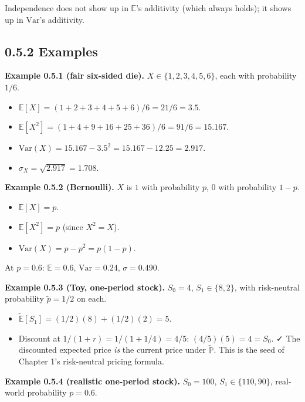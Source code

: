 \documentclass[
  10pt,
  twoside]{book}
\providecommand{\tightlist}{%
  \setlength{\itemsep}{0pt}\setlength{\parskip}{0pt}}
\begin{document}
Independence does not show up in \(\mathbb{E}\)'s additivity (which
always holds); it shows up in \(\mathrm{Var}\)'s additivity.

\subsection{0.5.2 Examples}\label{examples-4}

\textbf{Example 0.5.1 (fair six-sided die).}
\(X \in \{1, 2, 3, 4, 5, 6\}\), each with probability \(1/6\).

\begin{itemize}
\tightlist
\item
  \(\mathbb{E}[X] = (1+2+3+4+5+6)/6 = 21/6 = 3.5\).
\item
  \(\mathbb{E}[X^2] = (1+4+9+16+25+36)/6 = 91/6 = 15.167\).
\item
  \(\mathrm{Var}(X) = 15.167 - 3.5^2 = 15.167 - 12.25 = 2.917\).
\item
  \(\sigma_X = \sqrt{2.917} = 1.708\).
\end{itemize}

\textbf{Example 0.5.2 (Bernoulli).} \(X\) is \(1\) with probability
\(p\), \(0\) with probability \(1-p\).

\begin{itemize}
\tightlist
\item
  \(\mathbb{E}[X] = p\).
\item
  \(\mathbb{E}[X^2] = p\) (since \(X^2 = X\)).
\item
  \(\mathrm{Var}(X) = p - p^2 = p(1-p)\).
\end{itemize}

At \(p = 0.6\): \(\mathbb{E} = 0.6\), \(\mathrm{Var} = 0.24\),
\(\sigma = 0.490\).

\textbf{Example 0.5.3 (Toy, one-period stock).} \(S_0 = 4\),
\(S_1 \in \{8, 2\}\), with risk-neutral probability \(\tilde p = 1/2\)
on each.

\begin{itemize}
\tightlist
\item
  \(\tilde{\mathbb{E}}[S_1] = (1/2)(8) + (1/2)(2) = 5\).
\item
  Discount at \(1/(1+r) = 1/(1 + 1/4) = 4/5\): \((4/5)(5) = 4 = S_0\). ✓
  The discounted expected price \emph{is} the current price under
  \(\tilde{\mathbb{P}}\). This is the seed of Chapter 1's risk-neutral
  pricing formula.
\end{itemize}

\textbf{Example 0.5.4 (realistic one-period stock).} \(S_0 = 100\),
\(S_1 \in \{110, 90\}\), real-world probability \(p = 0.6\).
\end{document}
